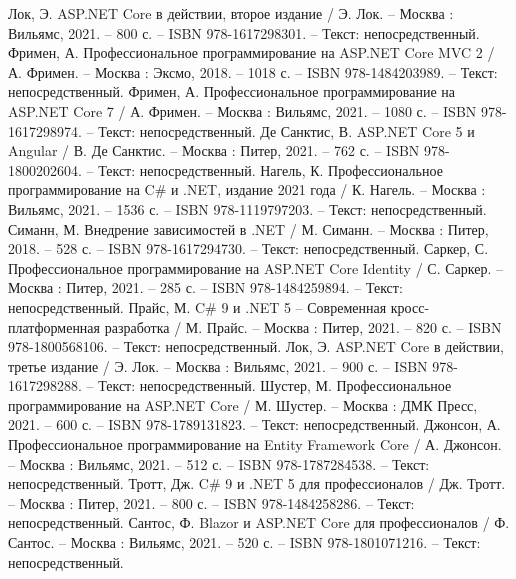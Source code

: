 
\begin{thebibliography}{9}
     Лок, Э. ASP.NET Core в действии, второе издание / Э. Лок. – Москва : Вильямс, 2021. – 800 с. – ISBN 978-1617298301. – Текст: непосредственный.
     Фримен, А. Профессиональное программирование на ASP.NET Core MVC 2 / А. Фримен. – Москва : Эксмо, 2018. – 1018 с. – ISBN 978-1484203989. – Текст: непосредственный.
     Фримен, А. Профессиональное программирование на ASP.NET Core 7 / А. Фримен. – Москва : Вильямс, 2021. – 1080 с. – ISBN 978-1617298974. – Текст: непосредственный.
     Де Санктис, В. ASP.NET Core 5 и Angular / В. Де Санктис. – Москва : Питер, 2021. – 762 с. – ISBN 978-1800202604. – Текст: непосредственный.
     Нагель, К. Профессиональное программирование на C\# и .NET, издание 2021 года / К. Нагель. – Москва : Вильямс, 2021. – 1536 с. – ISBN 978-1119797203. – Текст: непосредственный.
     Симанн, М. Внедрение зависимостей в .NET / М. Симанн. – Москва : Питер, 2018. – 528 с. – ISBN 978-1617294730. – Текст: непосредственный.
     Саркер, С. Профессиональное программирование на ASP.NET Core Identity / С. Саркер. – Москва : Питер, 2021. – 285 с. – ISBN 978-1484259894. – Текст: непосредственный.
     Прайс, М. C\# 9 и .NET 5 – Современная кросс-платформенная разработка / М. Прайс. – Москва : Питер, 2021. – 820 с. – ISBN 978-1800568106. – Текст: непосредственный.
     Лок, Э. ASP.NET Core в действии, третье издание / Э. Лок. – Москва : Вильямс, 2021. – 900 с. – ISBN 978-1617298288. – Текст: непосредственный.
     Шустер, М. Профессиональное программирование на ASP.NET Core / М. Шустер. – Москва : ДМК Пресс, 2021. – 600 с. – ISBN 978-1789131823. – Текст: непосредственный.
     Джонсон, А. Профессиональное программирование на Entity Framework Core / А. Джонсон. – Москва : Вильямс, 2021. – 512 с. – ISBN 978-1787284538. – Текст: непосредственный.
     Тротт, Дж. C\# 9 и .NET 5 для профессионалов / Дж. Тротт. – Москва : Питер, 2021. – 800 с. – ISBN 978-1484258286. – Текст: непосредственный.
     Сантос, Ф. Blazor и ASP.NET Core для профессионалов / Ф. Сантос. – Москва : Вильямс, 2021. – 520 с. – ISBN 978-1801071216. – Текст: непосредственный.

\end{thebibliography}
